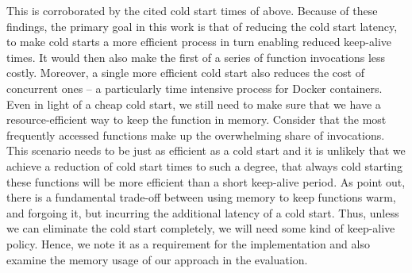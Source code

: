 This is corroborated by the cited cold start times of \citeauthor{Wang2018} above.
Because of these findings, the primary goal in this work is that of reducing the cold start latency, to make cold starts a more efficient process in turn enabling reduced keep-alive times. It would then also make the first of a series of function invocations less costly. Moreover, a single more efficient cold start also reduces the cost of concurrent ones -- a particularly time intensive process for Docker containers.
Even in light of a cheap cold start, we still need to make sure that we have a resource-efficient way to keep the function in memory. Consider that the most frequently accessed functions make up the overwhelming share of invocations. This scenario needs to be just as efficient as a cold start and it is unlikely that we achieve a reduction of cold start times to such a degree, that always cold starting these functions will be more efficient than a short keep-alive period.
As \citeauthor{Shahrad2020} point out, there is a fundamental trade-off between using memory to keep functions warm, and forgoing it, but incurring the additional latency of a cold start. Thus, unless we can eliminate the cold start completely, we will need some kind of keep-alive policy. Hence, we note it as a requirement for the implementation and also examine the memory usage of our approach in the evaluation.

